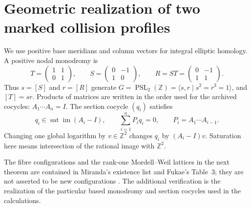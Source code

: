 \section{Geometric realization of two marked collision profiles}
\label{mapsD:repair:modular-collisions}

We use positive base meridians and column vectors for integral elliptic
homology.  A positive nodal monodromy is
\[
 T=\begin{pmatrix}1&1\\0&1\end{pmatrix},\qquad
 S=\begin{pmatrix}0&-1\\1&0\end{pmatrix},\qquad
 R=ST=\begin{pmatrix}0&-1\\1&1\end{pmatrix}.
\]
Thus $s=[S]$ and $r=[R]$ generate
$G=\operatorname{PSL}_2(\mathbb Z)=\langle s,r\mid s^2=r^3=1\rangle$,
and $[T]=sr$.  Products of matrices are written in the order used for
the archived cocycles: $A_1\cdots A_n=I$.  The section cocycle
$(q_i)$ satisfies
\begin{equation}\label{mapsD:repair:cocycle-relation}
 q_i\in\operatorname{sat}\operatorname{im}(A_i-I),\qquad
 \sum_{i=1}^n P_iq_i=0,\qquad P_i=A_1\cdots A_{i-1}.
\end{equation}
Changing one global logarithm by $v\in\mathbb Z^2$ changes $q_i$ by
$(A_i-I)v$.  Saturation here means intersection of the rational image
with $\mathbb Z^2$.

The fibre configurations and the rank-one Mordell--Weil lattices in
the next theorem are contained in Miranda's existence list and
Fukae's Table~3; they are not asserted to be new configurations
\cite[\S4, pp.~206--210]{manMiranda90}
\cite[Table~3, rows~50 and~56]{manFukae02}.
The additional verification is the realization of the particular
based monodromy and section cocycles used in the calculations.

